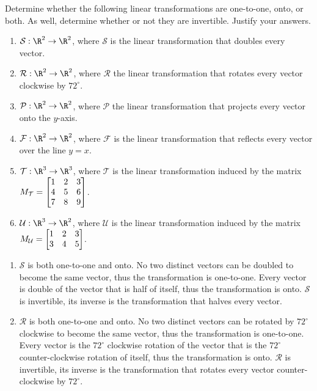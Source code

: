 \begin{exercises}
	\begin{problist}
		\prob Determine whether the following linear transformations are
		one-to-one, onto, or both. As well, determine whether or not they are
		invertible. Justify your answers.
		\begin{enumerate}
			\item $\mathcal S:\R^{2}\to\R^{2}$, where $\mathcal S$
				is the linear transformation that doubles every
				vector.

			\item $\mathcal R:\R^{2}\to\R^{2}$, where $\mathcal R$
				the linear transformation that rotates every
				vector clockwise by $72^{\circ}$.

			\item $\mathcal P:\R^{2}\to\R^{2}$, where $\mathcal P$
				the linear transformation that projects every
				vector onto the $y$-axis.

			\item $\mathcal F:\R^{2}\to\R^{2}$, where $\mathcal F$
				is the linear transformation that reflects every
				vector over the line $y=x$.

			\item $\mathcal T:\R^{3}\to\R^{3}$, where $\mathcal T$ is the linear
				transformation induced by the matrix
				$M_{\mathcal T} = \mat{1&2&3\\4&5&6\\7&8&9}$.

			\item $\mathcal U:\R^{3}\to\R^{2}$, where $\mathcal U$ is the linear
				transformation induced by the matrix
				$M_{\mathcal U} = \mat{1&2&3\\3&4&5}$.
		\end{enumerate}

		\begin{solution}
	    \begin{enumerate}
				\item
				$\mathcal S$ is both one-to-one and onto.
				No two distinct vectors can be doubled to become the same vector,
				thus the transformation is one-to-one.
				Every vector is double of the vector that is half of itself,
				thus the transformation is onto.
				$\mathcal S$ is invertible, its inverse is the transformation that
				halves every vector.

				\item
				$\mathcal R$ is both one-to-one and onto.
				No two distinct vectors can be rotated by $72^{\circ}$ clockwise to
				become the same vector,
				thus the transformation is one-to-one.
				Every vector is the $72^{\circ}$ clockwise rotation of the vector that
				is the $72^{\circ}$ counter-clockwise rotation of itself,
				thus the transformation is onto.
				$\mathcal R$ is invertible, its inverse is the transformation that
				rotates every vector counter-clockwise by $72^{\circ}$.


\end{enumerate}
\end{solution}
\end{problist}
\end{exercises}
